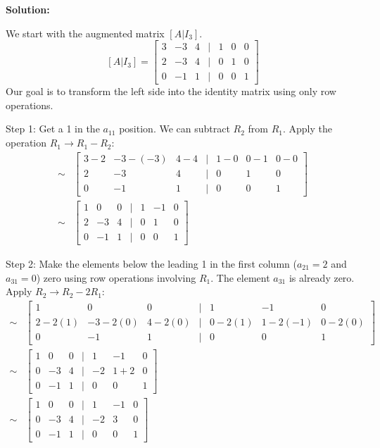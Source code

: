 \documentclass{article}
\begin{document}
\textbf{Solution:}

We start with the augmented matrix $[A | I_3]$.
\[ [A | I_3] = \begin{bmatrix} 3 & -3 & 4 & | & 1 & 0 & 0 \\ 2 & -3 & 4 & | & 0 & 1 & 0 \\ 0 & -1 & 1 & | & 0 & 0 & 1 \end{bmatrix} \]
Our goal is to transform the left side into the identity matrix using only row operations.

Step 1: Get a 1 in the $a_{11}$ position. We can subtract $R_2$ from $R_1$.
Apply the operation $R_1 \to R_1 - R_2$:
\begin{align*} \sim &\begin{bmatrix} 3 - 2 & -3 - (-3) & 4 - 4 & | & 1 - 0 & 0 - 1 & 0 - 0 \\ 2 & -3 & 4 & | & 0 & 1 & 0 \\ 0 & -1 & 1 & | & 0 & 0 & 1 \end{bmatrix} \\ \sim &\begin{bmatrix} 1 & 0 & 0 & | & 1 & -1 & 0 \\ 2 & -3 & 4 & | & 0 & 1 & 0 \\ 0 & -1 & 1 & | & 0 & 0 & 1 \end{bmatrix}\end{align*}

Step 2: Make the elements below the leading 1 in the first column ($a_{21}=2$ and $a_{31}=0$) zero using row operations involving $R_1$. The element $a_{31}$ is already zero.
Apply $R_2 \to R_2 - 2R_1$:
\begin{align*} \sim &\begin{bmatrix} 1 & 0 & 0 & | & 1 & -1 & 0 \\ 2 - 2(1) & -3 - 2(0) & 4 - 2(0) & | & 0 - 2(1) & 1 - 2(-1) & 0 - 2(0) \\ 0 & -1 & 1 & | & 0 & 0 & 1 \end{bmatrix} \\ \sim &\begin{bmatrix} 1 & 0 & 0 & | & 1 & -1 & 0 \\ 0 & -3 & 4 & | & -2 & 1 + 2 & 0 \\ 0 & -1 & 1 & | & 0 & 0 & 1 \end{bmatrix} \\ \sim &\begin{bmatrix} 1 & 0 & 0 & | & 1 & -1 & 0 \\ 0 & -3 & 4 & | & -2 & 3 & 0 \\ 0 & -1 & 1 & | & 0 & 0 & 1 \end{bmatrix}\end{align*}
\end{document}
